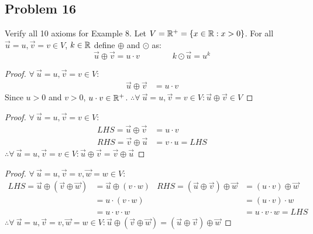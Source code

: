 \documentclass{article}
\begin{document}
\subsection*{Problem 16}
Verify all 10 axioms for Example 8. Let $V = \mathbb{R}^+ = \{x \in \mathbb{R}: x>0\}$. For all $\vec{u} = u,\vec{v} = v \in V$, $k\in \mathbb{R}$ define $\oplus$ and $\odot$ as:
\[
    \vec{u} \oplus \vec{v} = u \cdot v\qquad\qquad k \odot \vec{u} = u^k
\]
\begin{enumerate}
    \begin{proof}
        $\forall~\vec{u}=u,\vec{v}=v \in V$:
        \begin{align*}
            \vec{u} \oplus \vec{v} & = u \cdot v
        \end{align*}
        Since $u > 0$ and $v > 0$, $u \cdot v \in \mathbb{R}^+$. $\therefore \forall~\vec{u}=u,\vec{v}=v \in V: \vec{u} \oplus \vec{v} \in V$
    \end{proof}
    \begin{proof}
        $\forall~\vec{u}=u,\vec{v}=v \in V$:
        \begin{align*}
            LHS = \vec{u} \oplus \vec{v} & = u \cdot v       \\
            RHS = \vec{v} \oplus \vec{u} & = v \cdot u = LHS
        \end{align*}
        $\therefore \forall~\vec{u}=u,\vec{v}=v \in V: \vec{u} \oplus \vec{v} = \vec{v} \oplus \vec{u}$
    \end{proof}
    \begin{proof}
        $\forall~\vec{u}=u,\vec{v}=v,\vec{w}=w \in V$:
        \begin{align*}
            LHS = \vec{u} \oplus (\vec{v} \oplus \vec{w}) & = \vec{u} \oplus (v \cdot w) & RHS = (\vec{u} \oplus \vec{v}) \oplus \vec{w} & = (u \cdot v) \oplus \vec{w} \\
                                                          & = u \cdot (v \cdot w)        &                                               & = (u \cdot v) \cdot w        \\
                                                          & = u \cdot v \cdot w          &                                               & = u \cdot v \cdot w = LHS
        \end{align*}
        $\therefore \forall~\vec{u}=u,\vec{v}=v,\vec{w}=w \in V: \vec{u} \oplus (\vec{v} \oplus \vec{w}) = (\vec{u} \oplus \vec{v}) \oplus \vec{w}$
    \end{proof}

\end{enumerate}
\end{document}
